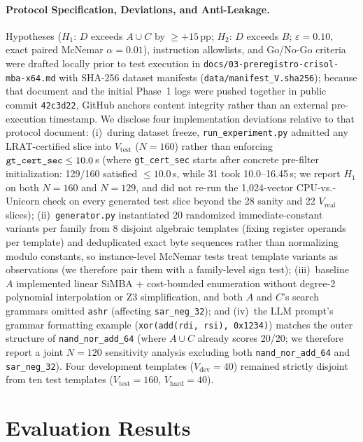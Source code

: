 \documentclass[11pt,a4paper]{article}
\begin{document}
\paragraph{Protocol Specification, Deviations, and Anti-Leakage.}
Hypotheses ($H_1$: $D$ exceeds $A \cup C$ by $\ge +15$\,pp; $H_2$: $D$ exceeds $B$; $\varepsilon = 0.10$, exact paired McNemar $\alpha = 0.01$), instruction allowlists, and Go/No-Go criteria were drafted locally prior to test execution in \texttt{docs/03-preregistro-crisol-mba-x64.md} with SHA-256 dataset manifests (\texttt{data/manifest\_V.sha256}); because that document and the initial Phase~1 logs were pushed together in public commit \texttt{42c3d22}, GitHub anchors content integrity rather than an external pre-execution timestamp. We disclose four implementation deviations relative to that protocol document:
(i)~during dataset freeze, \texttt{run\_experiment.py} admitted any LRAT-certified slice into $V_{\mathrm{test}}$ ($N=160$) rather than enforcing $\text{\texttt{gt\_cert\_sec}} \le 10.0$\,s (where \texttt{gt\_cert\_sec} starts after concrete pre-filter initialization: 129/160 satisfied $\le 10.0$\,s, while 31 took 10.0--16.45\,s; we report $H_1$ on both $N=160$ and $N=129$, and did not re-run the 1,024-vector CPU-vs.-Unicorn check on every generated test slice beyond the 28 sanity and 22 $V_{\mathrm{real}}$ slices);
(ii)~\texttt{generator.py} instantiated 20 randomized immediate-constant variants per family from 8 disjoint algebraic templates (fixing register operands per template) and deduplicated exact byte sequences rather than normalizing modulo constants, so instance-level McNemar tests treat template variants as observations (we therefore pair them with a family-level sign test);
(iii)~baseline $A$ implemented linear SiMBA + cost-bounded enumeration without degree-2 polynomial interpolation or Z3 simplification, and both $A$ and $C$'s search grammars omitted \texttt{ashr} (affecting \texttt{sar\_neg\_32}); and
(iv)~the LLM prompt's grammar formatting example (\texttt{xor(add(rdi, rsi), 0x1234)}) matches the outer structure of \texttt{nand\_nor\_add\_64} (where $A \cup C$ already scores 20/20; we therefore report a joint $N=120$ sensitivity analysis excluding both \texttt{nand\_nor\_add\_64} and \texttt{sar\_neg\_32}).
Four development templates ($V_{\mathrm{dev}}=40$) remained strictly disjoint from ten test templates ($V_{\mathrm{test}}=160$, $V_{\mathrm{hard}}=40$).

\section{Evaluation Results}
\end{document}
